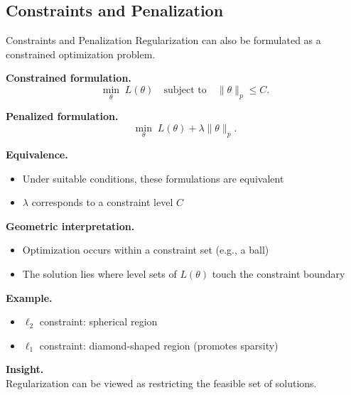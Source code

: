 \documentclass[aspectratio=169,11pt]{beamer}
\begin{document}
\subsection{Constraints and Penalization}
\begin{frame}[t,allowframebreaks]{Constraints and Penalization}
\small
Regularization can also be formulated as a constrained optimization problem.

\textbf{Constrained formulation.}\\ \[
\min_\theta \; L(\theta) \quad \text{subject to} \quad \|\theta\|_p \leq C.
\]

\textbf{Penalized formulation.}\\ \[
\min_\theta \; L(\theta) + \lambda \|\theta\|_p.
\]

\textbf{Equivalence.}\\ \begin{itemize}
    \item Under suitable conditions, these formulations are equivalent
    \item $\lambda$ corresponds to a constraint level $C$
\end{itemize}

\textbf{Geometric interpretation.}\\ \begin{itemize}
    \item Optimization occurs within a constraint set (e.g., a ball)
    \item The solution lies where level sets of $L(\theta)$ touch the constraint boundary
\end{itemize}

\textbf{Example.}\\ \begin{itemize}
    \item $\ell_2$ constraint: spherical region
    \item $\ell_1$ constraint: diamond-shaped region (promotes sparsity)
\end{itemize}

\textbf{Insight.}\\ Regularization can be viewed as restricting the feasible set of solutions.
\end{frame}
\end{document}
